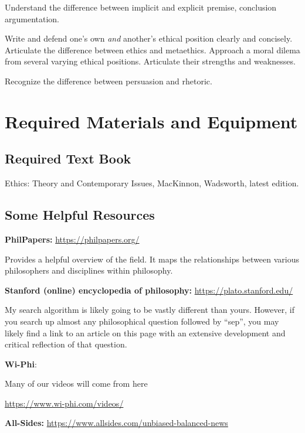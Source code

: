 \documentclass[
]{book}
\begin{document}
Understand the difference between implicit and explicit premise, conclusion argumentation.

Write and defend one's own \emph{and} another's ethical position clearly and concisely. Articulate the difference between ethics and metaethics. Approach a moral dilema from several varying ethical positions. Articulate their strengths and weaknesses.

Recognize the difference between persuasion and rhetoric.

\hypertarget{required-materials-and-equipment}{%
\chapter{Required Materials and Equipment}\label{required-materials-and-equipment}}

\hypertarget{required-text-book}{%
\section{Required Text Book}\label{required-text-book}}

Ethics: Theory and Contemporary Issues, MacKinnon, Wadsworth, latest edition.

\hypertarget{some-helpful-resources}{%
\section{Some Helpful Resources}\label{some-helpful-resources}}

\textbf{PhilPapers:} \url{https://philpapers.org/}

Provides a helpful overview of the field. It maps the relationships between various philosophers and disciplines within philosophy.

\textbf{Stanford (online) encyclopedia of philosophy:} \url{https://plato.stanford.edu/}

My search algorithm is likely going to be vastly different than yours. However, if you search up almost any philosophical question followed by ``sep'', you may likely find a link to an article on this page with an extensive development and critical reflection of that question.

\textbf{Wi-Phi}:

Many of our videos will come from here

\url{https://www.wi-phi.com/videos/}

\textbf{All-Sides:} \url{https://www.allsides.com/unbiased-balanced-news}
\end{document}
